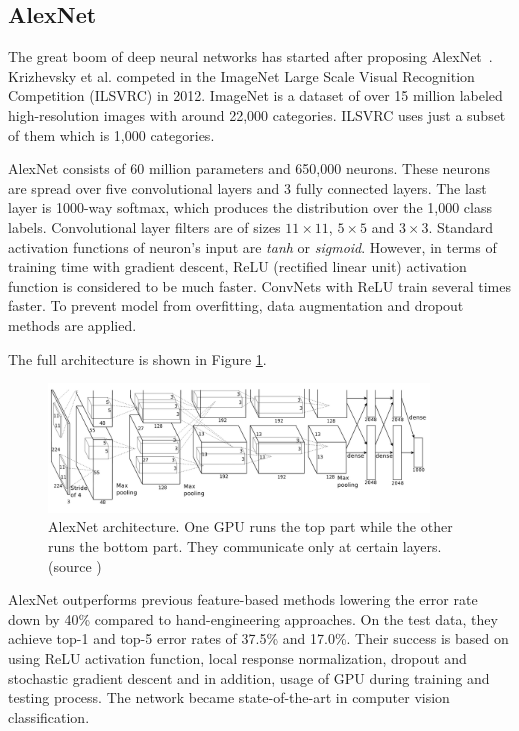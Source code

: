 \subsection{AlexNet}
\label{sec:cnn_rw:alexnet}

The great boom of deep neural networks has started after proposing
AlexNet~\cite{bib:krizhevsky2012imagenet}. Krizhevsky et al. competed in the
ImageNet Large Scale Visual Recognition Competition (ILSVRC) in 2012. ImageNet
\cite{bib:deng2009imagenet} is a dataset of over 15 million labeled high-resolution images
with around 22,000 categories. ILSVRC uses just a subset of them which is 1,000 categories.

AlexNet consists of 60 million parameters and 650,000 neurons. These neurons
are spread over five convolutional layers and 3 fully connected layers. The
last layer is 1000-way softmax, which produces the distribution over the 1,000 class
labels.
Convolutional layer filters are of sizes $11\times11$, $5\times5$ and $3\times3$.
Standard activation functions of neuron's input are \textit{tanh} or
\textit{sigmoid}. However, in terms of training time with gradient descent,
ReLU (rectified linear unit) activation function is
considered to be much faster. ConvNets with ReLU train several times faster.
To prevent model from overfitting, data augmentation and dropout methods are applied.

The full architecture is shown in Figure \ref{img:alexnet_architecture}.

\begin{figure}[h]
	\centerline{\includegraphics[width=0.9\textwidth]{images/alexnet_architecture.png}}
	\caption[AlexNet architecture]{AlexNet architecture. One GPU runs the
		top part while the other runs the bottom part. They communicate only at
		certain layers. (source \cite{bib:krizhevsky2012imagenet})}
	\label{img:alexnet_architecture}
\end{figure}

AlexNet outperforms previous feature-based methods lowering the error rate down by
40\% compared to hand-engineering approaches. On the test data, they achieve top-1 and
top-5 error rates of 37.5\% and 17.0\%.
Their success is based on using ReLU activation function, local response normalization,
dropout and stochastic gradient descent and in addition, usage of GPU during training
and testing process. The network became state-of-the-art in computer vision
classification.


